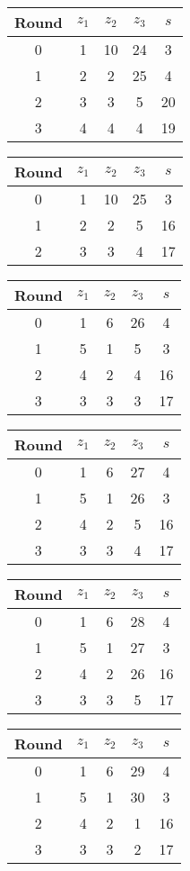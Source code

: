 \begin{multicols}{2}
\begin{tabular}{c | c | c | c | c }
Round & $z_1$ & $z_2$ & $z_3$ & $s$ \\
\hline
0 & 1 & 10 & 24 & 3 \\
1 & 2 & 2 & 25 & 4 \\
2 & 3 & 3 & 5 & 20 \\
3 & 4 & 4 & 4 & 19
\end{tabular}


\begin{tabular}{c | c | c | c | c }
Round & $z_1$ & $z_2$ & $z_3$ & $s$ \\
\hline
0 & 1 & 10 & 25 & 3 \\
1 & 2 & 2 & 5 & 16 \\
2 & 3 & 3 & 4 & 17
\end{tabular}


\begin{tabular}{c | c | c | c | c }
Round & $z_1$ & $z_2$ & $z_3$ & $s$ \\
\hline
0 & 1 & 6 & 26 & 4 \\
1 & 5 & 1 & 5 & 3 \\
2 & 4 & 2 & 4 & 16 \\
3 & 3 & 3 & 3 & 17
\end{tabular}


\begin{tabular}{c | c | c | c | c }
Round & $z_1$ & $z_2$ & $z_3$ & $s$ \\
\hline
0 & 1 & 6 & 27 & 4 \\
1 & 5 & 1 & 26 & 3 \\
2 & 4 & 2 & 5 & 16 \\
3 & 3 & 3 & 4 & 17
\end{tabular}


\begin{tabular}{c | c | c | c | c }
Round & $z_1$ & $z_2$ & $z_3$ & $s$ \\
\hline
0 & 1 & 6 & 28 & 4 \\
1 & 5 & 1 & 27 & 3 \\
2 & 4 & 2 & 26 & 16 \\
3 & 3 & 3 & 5 & 17
\end{tabular}


\begin{tabular}{c | c | c | c | c }
Round & $z_1$ & $z_2$ & $z_3$ & $s$ \\
\hline
0 & 1 & 6 & 29 & 4 \\
1 & 5 & 1 & 30 & 3 \\
2 & 4 & 2 & 1 & 16 \\
3 & 3 & 3 & 2 & 17
\end{tabular}



\end{multicols}
